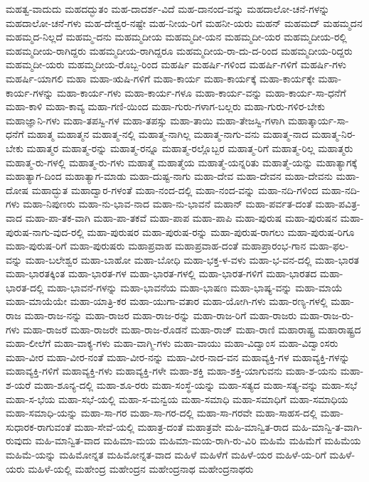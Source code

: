{ಮಹತ್ವ-ವಾದುದು
ಮಹದದ್ಭುತಂ
ಮಹ-ದಾದರ್ಶ-ವಿದೆ
ಮಹ-ದಾನಂದ-ವನ್ನು
ಮಹದಾಲೋ-ಚನೆ-ಗಳನ್ನು
ಮಹದಾಲೋ-ಚನೆ-ಗಳು
ಮಹ-ದೇಶ್ವರ-ನಷ್ಟೇ
ಮಹ-ನೀಯ-ರಿಗೆ
ಮಹನೀ-ಯರು
ಮಹನ್
ಮಹಮದ್
ಮಹಮ್ಮದನ
ಮಹಮ್ಮದ-ನಿಲ್ಲದೆ
ಮಹಮ್ಮ-ದನು
ಮಹಮ್ಮದೀಯ
ಮಹಮ್ಮದೀ-ಯನ
ಮಹಮ್ಮದೀ-ಯರ
ಮಹಮ್ಮದೀಯ-ರಲ್ಲಿ
ಮಹಮ್ಮದೀಯ-ರಾಗಿದ್ದರು
ಮಹಮ್ಮದೀಯ-ರಾಗಿದ್ದರೂ
ಮಹಮ್ಮದೀಯ-ರಾ-ದು-ದ-ರಿಂದ
ಮಹಮ್ಮದೀಯ-ರಿದ್ದರು
ಮಹಮ್ಮದೀ-ಯರು
ಮಹಮ್ಮದೀಯ-ರೊಬ್ಬ-ರಿಂದ
ಮಹರ್ಷಿ
ಮಹರ್ಷಿ-ಗಳಿಂದ
ಮಹರ್ಷಿ-ಗಳಿಗೆ
ಮಹರ್ಷಿ-ಗಳು
ಮಹರ್ಷಿ-ಯಾಗಲಿ
ಮಹಾ
ಮಹಾ-ಋಷಿ-ಗಳಿಗೆ
ಮಹಾ-ಕಾರ್ಯ
ಮಹಾ-ಕಾರ್ಯಕ್ಕೆ
ಮಹಾ-ಕಾರ್ಯಕ್ಕೇ
ಮಹಾ-ಕಾರ್ಯ-ಗಳನ್ನು
ಮಹಾ-ಕಾರ್ಯ-ಗಳು
ಮಹಾ-ಕಾರ್ಯ-ಗಳೂ
ಮಹಾ-ಕಾರ್ಯ-ವನ್ನು
ಮಹಾ-ಕಾರ್ಯ-ಸಾ-ಧನೆಗೆ
ಮಹಾ-ಕಾಳಿ
ಮಹಾ-ಕಾವ್ಯ
ಮಹಾ-ಗಣಿ-ಯಿಂದ
ಮಹಾ-ಗುರು-ಗಳಾಗ-ಬಲ್ಲರು
ಮಹಾ-ಗುರು-ಗಳಿರ-ಬೇಕು
ಮಹಾಜ್ಞಾನಿ-ಗಳು
ಮಹಾ-ತಪಸ್ವಿ-ಗಳ
ಮಹಾ-ತಪಸ್ಸು
ಮಹಾ-ತಾಯಿ
ಮಹಾ-ತೇಜಸ್ವಿ-ಗಳಾಗಿ
ಮಹಾತ್ಕಾರ್ಯ-ಸಾ-ಧನೆಗೆ
ಮಹಾತ್ಮ
ಮಹಾತ್ಮನ
ಮಹಾತ್ಮ-ನಲ್ಲಿ
ಮಹಾತ್ಮ-ನಾಗಿಲ್ಲ
ಮಹಾತ್ಮ-ನಾಗು-ವನು
ಮಹಾತ್ಮ-ನಾದ
ಮಹಾತ್ಮ-ನಿರ-ಬೇಕು
ಮಹಾತ್ಮರ
ಮಹಾತ್ಮ-ರನ್ನು
ಮಹಾತ್ಮ-ರನ್ನೂ
ಮಹಾತ್ಮ-ರಲ್ಲೊಬ್ಬರ
ಮಹಾತ್ಮ-ರಿಗೆ
ಮಹಾತ್ಮ-ರಿಲ್ಲ
ಮಹಾತ್ಮರು
ಮಹಾತ್ಮ-ರು-ಗಳಲ್ಲಿ
ಮಹಾತ್ಮ-ರು-ಗಳು
ಮಹಾತ್ಮೆ
ಮಹಾತ್ಮೆಯ
ಮಹಾತ್ಮೆ-ಯನ್ನರಿತು
ಮಹಾತ್ಮೆ-ಯನ್ನು
ಮಹಾತ್ಯಾಗಕ್ಕೆ
ಮಹಾತ್ಯಾಗ-ದಿಂದ
ಮಹಾತ್ಯಾಗ-ಮಾಡು
ಮಹಾ-ದುಷ್ಟ-ನಾಗು
ಮಹಾ-ದೇವ
ಮಹಾ-ದೇವನ
ಮಹಾ-ದೇವನು
ಮಹಾ-ದೋಷ
ಮಹಾದ್ಭುತ
ಮಹಾದ್ವಾರ-ಗಳಂತೆ
ಮಹಾ-ನಂದ-ದಲ್ಲಿ
ಮಹಾ-ನಂದ-ವನ್ನು
ಮಹಾ-ನದಿ-ಗಳಿಂದ
ಮಹಾ-ನದಿ-ಗಳು
ಮಹಾ-ನಿಪುಣರು
ಮಹಾ-ನು-ಭಾವ-ನಾದ
ಮಹಾ-ನು-ಭಾವನೆ
ಮಹಾನ್
ಮಹಾ-ಪರ್ವತ-ದಂತೆ
ಮಹಾ-ಪವಿತ್ರ-ವಾದ
ಮಹಾ-ಪಾ-ತಕ-ವಾಗಿ
ಮಹಾ-ಪಾ-ತಕವೆ
ಮಹಾ-ಪಾಪ
ಮಹಾ-ಪಾಪಿ
ಮಹಾ-ಪುರುಷ
ಮಹಾ-ಪುರುಷನ
ಮಹಾ-ಪುರುಷ-ನಾಗು-ವುದ-ರಲ್ಲಿ
ಮಹಾ-ಪುರುಷರ
ಮಹಾ-ಪುರುಷ-ರನ್ನು
ಮಹಾ-ಪುರುಷ-ರಾಗಲು
ಮಹಾ-ಪುರುಷ-ರಿಗೂ
ಮಹಾ-ಪುರುಷ-ರಿಗೆ
ಮಹಾ-ಪುರುಷರು
ಮಹಾಪ್ರವಾಹ
ಮಹಾಪ್ರವಾಹ-ದಂತೆ
ಮಹಾಪ್ರಾರಂಭ-ಗಾನ
ಮಹಾ-ಫಲ-ವನ್ನು
ಮಹಾ-ಬಲೇಶ್ವರ
ಮಹಾ-ಬಾಹೋ
ಮಹಾ-ಬೋಧಿ
ಮಹಾ-ಭಕ್ತ-ಳ-ವಳು
ಮಹಾ-ಭ-ವನ-ದಲ್ಲಿ
ಮಹಾ-ಭಾರತ
ಮಹಾ-ಭಾರತಕ್ಕಿಂತ
ಮಹಾ-ಭಾರತ-ಗಳ
ಮಹಾ-ಭಾರತ-ಗಳಲ್ಲಿ
ಮಹಾ-ಭಾರತ-ಗಳಿಗೆ
ಮಹಾ-ಭಾರತದ
ಮಹಾ-ಭಾರತ-ದಲ್ಲಿ
ಮಹಾ-ಭಾವನೆ-ಗಳನ್ನು
ಮಹಾ-ಭಾವನೆಯ
ಮಹಾ-ಭಾಷಣ
ಮಹಾ-ಭಾಷ್ಯ-ವನ್ನು
ಮಹಾ-ಮಾಯೆ
ಮಹಾ-ಮಾಯೆಯೇ
ಮಹಾ-ಯಾತ್ರಿ-ಕರ
ಮಹಾ-ಯುಗಾ-ವತಾರ
ಮಹಾ-ಯೋಗಿ-ಗಳು
ಮಹಾ-ರಣ್ಯ-ಗಳಲ್ಲಿ
ಮಹಾ-ರಾಜ
ಮಹಾ-ರಾಜ-ನನ್ನು
ಮಹಾ-ರಾಜರ
ಮಹಾ-ರಾಜ-ರನ್ನು
ಮಹಾ-ರಾಜ-ರಿಗೆ
ಮಹಾ-ರಾಜರು
ಮಹಾ-ರಾಜ-ರು-ಗಳು
ಮಹಾ-ರಾಜರೆ
ಮಹಾ-ರಾಜರೇ
ಮಹಾ-ರಾಜ-ರೊಡನೆ
ಮಹಾ-ರಾಜ್
ಮಹಾ-ರಾಣಿ
ಮಹಾರಾಷ್ಟ್ರ
ಮಹಾರಾಷ್ಟ್ರದ
ಮಹಾ-ಲೀಲೆಗೆ
ಮಹಾ-ವಾಕ್ಯ-ಗಳು
ಮಹಾ-ವಾಗ್ಮಿ-ಗಳು
ಮಹಾ-ವಾಯು
ಮಹಾ-ವಿದ್ವಾಂಸ
ಮಹಾ-ವಿದ್ವಾಂಸರು
ಮಹಾ-ವೀರ
ಮಹಾ-ವೀರ-ನಂತೆ
ಮಹಾ-ವೀರ-ನನ್ನು
ಮಹಾ-ವೀರ-ನಾದ-ವನ
ಮಹಾವ್ಯಕ್ತಿ-ಗಳ
ಮಹಾವ್ಯಕ್ತಿ-ಗಳನ್ನು
ಮಹಾವ್ಯಕ್ತಿ-ಗಳಿಗೆ
ಮಹಾವ್ಯಕ್ತಿ-ಗಳು
ಮಹಾವ್ಯಕ್ತಿ-ಗಳೇ
ಮಹಾ-ಶಕ್ತಿ
ಮಹಾ-ಶಕ್ತಿ-ಯಾಗುವನು
ಮಹಾ-ಶ-ಯನು
ಮಹಾ-ಶ-ಯರೆ
ಮಹಾ-ಶೂನ್ಯ-ದಲ್ಲಿ
ಮಹಾ-ಶೂ-ರರು
ಮಹಾ-ಸಂಸ್ಥೆ-ಯನ್ನು
ಮಹಾ-ಸತ್ಯದ
ಮಹಾ-ಸತ್ಯ-ವನ್ನು
ಮಹಾ-ಸಭೆ
ಮಹಾ-ಸ-ಭೆಯ
ಮಹಾ-ಸಭೆ-ಯಲ್ಲಿ
ಮಹಾ-ಸ-ಮನ್ವಯ
ಮಹಾ-ಸಮಾಧಿ
ಮಹಾ-ಸಮಾಧಿಗೆ
ಮಹಾ-ಸಮಾಧಿಯ
ಮಹಾ-ಸಮಾಧಿ-ಯನ್ನು
ಮಹಾ-ಸಾ-ಗರ
ಮಹಾ-ಸಾ-ಗರ-ದಲ್ಲಿ
ಮಹಾ-ಸಾ-ಗರವೇ
ಮಹಾ-ಸಾಹಸ-ದಲ್ಲಿ
ಮಹಾ-ಸುಧಾರಕ-ರಾಗುವಂತೆ
ಮಹಾ-ಸೇವೆ-ಯಲ್ಲಿ
ಮಹಾತ್ರ-ದಂತೆ
ಮಹಾತ್ರವೇ
ಮಹಿ-ಮಾನ್ವಿತ-ರಾದ
ಮಹಿ-ಮಾನ್ವಿ-ತ-ವಾಗಿ-ರುವುದು
ಮಹಿ-ಮಾನ್ವಿತ-ವಾದ
ಮಹಿಮಾ-ಮಯ
ಮಹಿಮಾ-ಮಯ-ರಾಗಿ-ರು-ವಿರಿ
ಮಹಿಮೆ
ಮಹಿಮೆಗೆ
ಮಹಿಮೆಯ
ಮಹಿಮೆ-ಯನ್ನು
ಮಹಿಮೋನ್ನತ
ಮಹಿಮೋನ್ನತ-ವಾದ
ಮಹಿಳೆ
ಮಹಿಳೆಗೆ
ಮಹಿಳೆ-ಯರ
ಮಹಿಳೆ-ಯ-ರಿಗೆ
ಮಹಿಳೆ-ಯರು
ಮಹಿಳೆ-ಯಲ್ಲಿ
ಮಹೇಂದ್ರ
ಮಹೇಂದ್ರನ
ಮಹೇಂದ್ರನಾಥ
ಮಹೇಂದ್ರನಾಥರು
}
